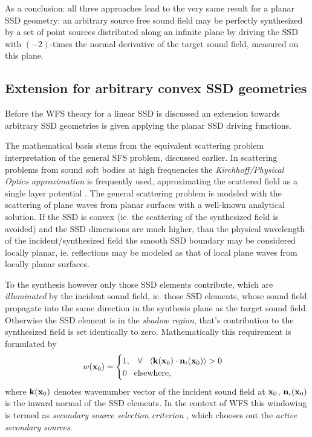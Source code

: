 As a conclusion: all three approaches lead to the very same result for a planar SSD geometry: an arbitrary source free sound field may be perfectly synthesized by a set of point sources distributed along an infinite plane by driving the SSD with $(-2)$-times the normal derivative of the target sound field, measured on this plane.

\subsection{Extension for arbitrary convex SSD geometries}

Before the WFS theory for a linear SSD is discussed an extension towards arbitrary SSD geometries is given applying the planar SSD driving functions.

The mathematical basis stems from the equivalent scattering problem interpretation of the general SFS problem, discussed earlier. 
In scattering problems from sound soft bodies at high frequencies the \emph{Kirchhoff/Physical Optics approximation} is frequently used, approximating the scattered field as a single layer potential \cite{Fazi2013:Equivalent_scattering, ColtonKress1998}.
The general scattering problem is modeled with the scattering of plane waves from planar surfaces with a well-known analytical solution.
If the SSD is convex (ie. the scattering of the synthesized field is avoided) and the SSD dimensions are much higher, than the physical wavelength of the incident/synthesized field the smooth SSD boundary may be considered locally planar, ie. reflections may be modeled as that of local plane waves from locally planar surfaces.

To the synthesis however only those SSD elements contribute, which are \emph{illuminated} by the incident sound field, ie. those SSD elements, whose sound field propagate into the same direction in the synthesis plane as the target sound field. Otherwise the SSD element is in the \emph{shadow region}, that's contribution to the synthesized field is set identically to zero.
Mathematically this requirement is formulated by
\begin{equation}
w(\mathbf{x}_0) = \begin{cases}
                        1, \hspace{3mm} \forall \hspace{3mm} \langle \mathbf{k}(\mathbf{x}_0) \cdot \mathbf{n}_i(\mathbf{x}_0) \rangle > 0 \\
                        0  \hspace{3mm} \text{elsewhere},
                    \end{cases}
\end{equation}
where $\mathbf{k}(\mathbf{x}_0)$ denotes wavenumber vector of the incident sound field at $\mathbf{x}_0$, $ \mathbf{n}_i(\mathbf{x}_0)$ is the inward normal of the SSD elements.
In the context of WFS this windowing is termed as \emph{secondary source selection criterion} \cite{Spors2007, Spors2007:DAGA:SS_selection_criterion}, which chooses out the \emph{active secondary sources}.

